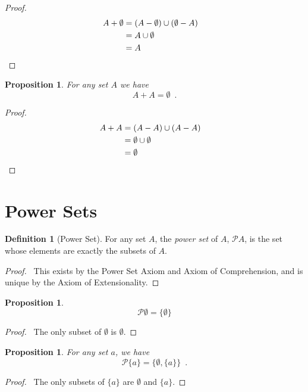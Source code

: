 \documentclass{report}
\let\qed\relax
\newtheorem{prop}[ax]{Proposition}
\theoremstyle{definition}
\newtheorem{df}[ax]{Definition}
\begin{document}
\begin{proof}
\pf
\begin{align*}
A + \emptyset & = (A - \emptyset) \cup (\emptyset - A) \\
& = A \cup \emptyset \\
& = A & \qed
\end{align*}
\end{proof}

\begin{prop}
For any set $A$ we have
\[ A + A = \emptyset \enspace . \]
\end{prop}

\begin{proof}
\pf
\begin{align*}
A + A & = (A - A) \cup (A - A) \\
& = \emptyset \cup \emptyset \\
& = \emptyset & \qed
\end{align*}
\end{proof}

\section{Power Sets}

\begin{df}[Power Set]
For any set $A$, the \emph{power set} of $A$, $\mathcal{P} A$, is the set whose elements are exactly the subsets of $A$.
\end{df}

\begin{proof}
\pf\ This exists by the Power Set Axiom and Axiom of Comprehension, and is unique by the Axiom of Extensionality. \qed
\end{proof}

\begin{prop}
\[ \mathcal{P} \emptyset = \{ \emptyset \} \]
\end{prop}

\begin{proof}
\pf\ The only subset of $\emptyset$ is $\emptyset$. \qed
\end{proof}

\begin{prop}
For any set $a$, we have
\[ \mathcal{P} \{ a \} = \{ \emptyset, \{ a \} \} \enspace . \]
\end{prop}

\begin{proof}
\pf\ The only subsets of $\{a\}$ are $\emptyset$ and $\{a\}$. \qed
\end{proof}
\end{document}
